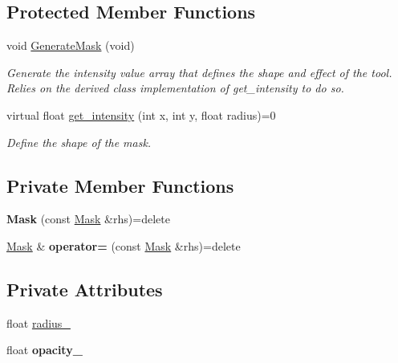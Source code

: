 \subsection*{Protected Member Functions}
\begin{DoxyCompactItemize}
\item 
void \hyperlink{classimage__tools_1_1Mask_acbb15ffd3c486510b556d70bdc4a7740}{Generate\+Mask} (void)\hypertarget{classimage__tools_1_1Mask_acbb15ffd3c486510b556d70bdc4a7740}{}\label{classimage__tools_1_1Mask_acbb15ffd3c486510b556d70bdc4a7740}

\begin{DoxyCompactList}\small\item\em Generate the intensity value array that defines the shape and effect of the tool. Relies on the derived class implementation of get\+\_\+intensity to do so. \end{DoxyCompactList}\item 
virtual float \hyperlink{classimage__tools_1_1Mask_a72f63a05779159c4f5e2bfea21160c8a}{get\+\_\+intensity} (int x, int y, float radius)=0
\begin{DoxyCompactList}\small\item\em Define the shape of the mask. \end{DoxyCompactList}\end{DoxyCompactItemize}
\subsection*{Private Member Functions}
\begin{DoxyCompactItemize}
\item 
{\bfseries Mask} (const \hyperlink{classimage__tools_1_1Mask}{Mask} \&rhs)=delete\hypertarget{classimage__tools_1_1Mask_ae42a9089c82cdf624560a0201e3fa138}{}\label{classimage__tools_1_1Mask_ae42a9089c82cdf624560a0201e3fa138}

\item 
\hyperlink{classimage__tools_1_1Mask}{Mask} \& {\bfseries operator=} (const \hyperlink{classimage__tools_1_1Mask}{Mask} \&rhs)=delete\hypertarget{classimage__tools_1_1Mask_a4d312e1eeee6d449df299e1413cd7e4e}{}\label{classimage__tools_1_1Mask_a4d312e1eeee6d449df299e1413cd7e4e}

\end{DoxyCompactItemize}
\subsection*{Private Attributes}
\begin{DoxyCompactItemize}
\item 
float \hyperlink{classimage__tools_1_1Mask_a6cbfdf0dac5401d3c296f1a33c92ec46}{radius\+\_\+}
\item 
float {\bfseries opacity\+\_\+}\hypertarget{classimage__tools_1_1Mask_aceb1552d63b5ccd76e4096b2a36ffd99}{}\label{classimage__tools_1_1Mask_aceb1552d63b5ccd76e4096b2a36ffd99}

\end{DoxyCompactItemize}


